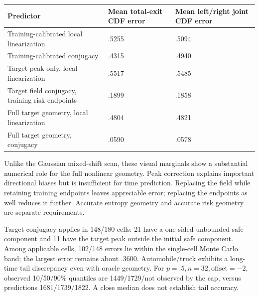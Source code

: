 {\def\LTcaptype{table} %
\begin{longtable}[]{@{}
  >{\raggedright\arraybackslash}p{}
  >{\raggedleft\arraybackslash}p{}
  >{\raggedleft\arraybackslash}p{}@{}}
\toprule\noalign{}
\begin{minipage}[b]{\linewidth}\raggedright
Predictor
\end{minipage} & \begin{minipage}[b]{\linewidth}\raggedleft
Mean total-exit CDF error
\end{minipage} & \begin{minipage}[b]{\linewidth}\raggedleft
Mean left/right joint CDF error
\end{minipage} \\
\midrule\noalign{}
\endhead
\bottomrule\noalign{}
\endlastfoot
Training-calibrated local linearization & .5255 & .5094 \\
Training-calibrated conjugacy & .4315 & .4940 \\
Target peak only, local linearization & .5517 & .5485 \\
Target field conjugacy, training risk endpoints & .1899 & .1858 \\
Full target geometry, local linearization & .4804 & .4821 \\
Full target geometry, conjugacy & .0590 & .0578 \\
\end{longtable}
}

Unlike the Gaussian mixed-shift scan, these visual marginals show a
substantial numerical role for the full nonlinear geometry. Peak
correction explains important directional biases but is insufficient for
time prediction. Replacing the field while retaining training endpoints
leaves appreciable error; replacing the endpoints as well reduces it
further. Accurate entropy geometry and accurate risk geometry are
separate requirements.

Target conjugacy applies in 148/180 cells: 21 have a one-sided unbounded
safe component and 11 have the target peak outside the initial safe
component. Among applicable cells, 102/148 errors lie within the
single-cell Monte Carlo band; the largest error remains about .3600.
Automobile/truck exhibits a long-time tail discrepancy even with oracle
geometry. For \(p=.5,n=32,\mathrm{offset}=-2\), observed 10/50/90\%
quantiles are 1449/1729/not observed by the cap, versus predictions
1681/1739/1822. A close median does not establish tail accuracy.

